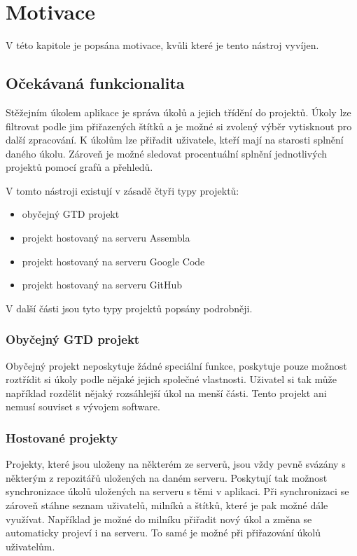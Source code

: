 \chapter{Motivace}

V této kapitole je popsána motivace, kvůli které je tento nástroj vyvíjen.

\section{Očekávaná funkcionalita}

Stěžejním úkolem aplikace je správa úkolů a jejich třídění do projektů. Úkoly lze filtrovat podle jim přiřazených štítků a je možné si zvolený výběr vytisknout pro další zpracování. K úkolům lze přiřadit uživatele, kteří mají na starosti splnění daného úkolu. Zároveň je možné sledovat procentuální splnění jednotlivých projektů pomocí grafů a přehledů.

V tomto nástroji existují v zásadě čtyři typy projektů:

\begin{itemize}
\item obyčejný GTD projekt
\item projekt hostovaný na serveru Assembla
\item projekt hostovaný na serveru Google Code
\item projekt hostovaný na serveru GitHub
\end{itemize}

V další části jsou tyto typy projektů popsány podrobněji.

\subsection{Obyčejný GTD projekt}

Obyčejný projekt neposkytuje žádné speciální funkce, poskytuje pouze možnost roztřídit si úkoly podle nějaké jejich společné vlastnosti. Uživatel si tak může například rozdělit nějaký rozsáhlejší úkol na menší části. Tento projekt ani nemusí souviset s vývojem software.

\subsection{Hostované projekty}

Projekty, které jsou uloženy na některém ze serverů, jsou vždy pevně svázány s některým z repozitářů uložených na daném serveru. Poskytují tak možnost synchronizace úkolů uložených na serveru s těmi v aplikaci. Při synchronizaci se zároveň stáhne seznam uživatelů, milníků a štítků, které je pak možné dále využívat. Například je možné do milníku přiřadit nový úkol a změna se automaticky projeví i na serveru. To samé je možné při přiřazování úkolů uživatelům.

